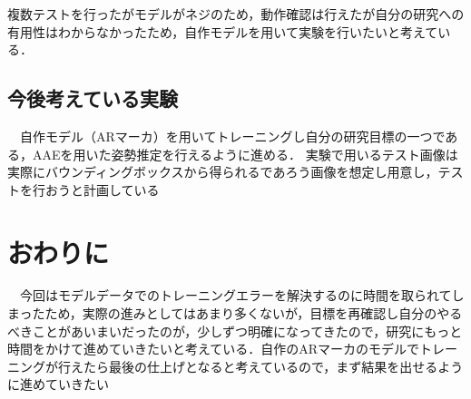 \documentclass[11pt,a4j,ascmac]{jsarticle}
\begin{document}
複数テストを行ったがモデルがネジのため，動作確認は行えたが自分の研究への有用性はわからなかったため，自作モデルを用いて実験を行いたいと考えている．

\subsection{今後考えている実験}
　自作モデル（ARマーカ）を用いてトレーニングし自分の研究目標の一つである，AAEを用いた姿勢推定を行えるように進める．
実験で用いるテスト画像は実際にバウンディングボックスから得られるであろう画像を想定し用意し，テストを行おうと計画している




\section{おわりに}
　今回はモデルデータでのトレーニングエラーを解決するのに時間を取られてしまったため，実際の進みとしてはあまり多くないが，目標を再確認し自分のやるべきことがあいまいだったのが，少しずつ明確になってきたので，研究にもっと時間をかけて進めていきたいと考えている．自作のARマーカのモデルでトレーニングが行えたら最後の仕上げとなると考えているので，まず結果を出せるように進めていきたい

\end{document}
